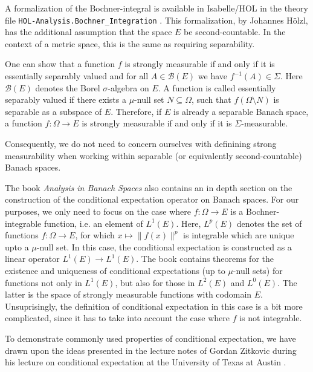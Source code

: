 A formalization of the Bochner-integral is available in Isabelle/HOL in the theory file \texttt{HOL-Analysis.Bochner\_Integration} \cite{hoelzl2011measuretheory}. This formalization, by Johannes Hölzl, has the additional assumption that the space $E$ be second-countable. In the context of a metric space, this is the same as requiring separability.
\vspace{0.3cm}
\begin{remark}

One can show that a function $f$ is strongly measurable if and only if it is essentially separably valued and for all $A \in \mathcal{B}(E)$ we have $f^{-1}(A) \in \Sigma$. Here $\mathcal{B}(E)$ denotes the Borel $\sigma$-algebra on $E$. A function is called essentially separably valued if there exists a $\mu$-null set $N \subseteq \Omega$, such that $f (\Omega \setminus N)$ is separable as a subspace of $E$. Therefore, if $E$ is already a separable Banach space, a function $f : \Omega \rightarrow E$ is strongly measurable if and only if it is $\Sigma$-measurable.

Consequently, we do not need to concern ourselves with definining strong measurability when working within separable (or equivalently second-countable) Banach spaces.
\end{remark}
\vspace{0.3cm}

The book \textit{Analysis in Banach Spaces} also contains an in depth section on the construction of the conditional expectation operator on Banach spaces. For our purposes, we only need to focus on the case where $f : \Omega \rightarrow E$ is a Bochner-integrable function, i.e. an element of $L^1(E)$. Here, $L^p(E)$ denotes the set of functions $f: \Omega \rightarrow E$, for which $x \mapsto \lVert f(x) \rVert^p$ is integrable which are unique upto a $\mu$-null set. In this case, the conditional expectation is constructed as a linear operator $L^1(E) \rightarrow L^1(E)$. The book contains theorems for the existence and uniqueness of conditional expectations (up to $\mu$-null sets) for functions not only in $L^1(E)$, but also for those in $L^2(E)$ and $L^0(E)$. The latter is the space of strongly measurable functions with codomain $E$. Unsuprisingly, the definition of conditional expectation in this case is a bit more complicated, since it has to take into account the case where $f$ is not integrable.

To demonstrate commonly used properties of conditional expectation, we have drawn upon the ideas presented in the lecture notes of Gordan Zitkovic during his lecture on conditional expectation at the University of Texas at Austin \cite{Zitkovic_2015}.

